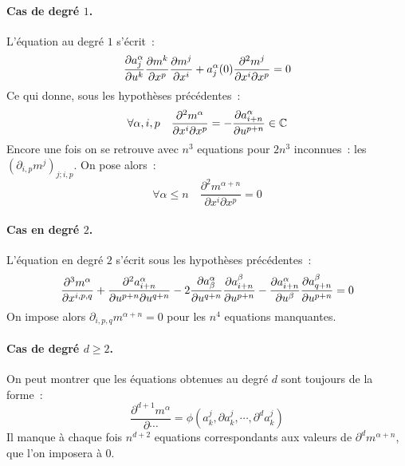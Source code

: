 \documentclass[a4paper,draft]{amsart}
\begin{document}
\paragraph{Cas de degré $1$.}
L'équation au degré $1$ s'écrit~:
\[
\dfrac{\partial{a_j^\alpha}}{\partial{u^k}}\dfrac{\partial{m^k}}{\partial{x^p}}\dfrac{\partial{m^j}}{\partial{x^i}} + a_j^\alpha(0)\dfrac{\partial^2 m^j}{\partial x^i \partial x^p} = 0
\]
Ce qui donne, sous les hypothèses précédentes~:
\[
\forall \alpha, i, p \quad \dfrac{\partial^2 m^\alpha}{\partial x^i \partial x^p} = -\dfrac{\partial{a_{i+n}^\alpha}}{\partial{u^{p+n}}} \in \mathbb{C}
\]
Encore une fois on se retrouve avec $n^3$ equations pour $2n^3$ inconnues~: les $(\partial_{i,p}m^j)_{j;i,p}$.
On pose alors~:
\[
\forall \alpha \leq n \quad \dfrac{\partial^2 m^{\alpha+n}}{\partial x^i \partial x^p} = 0
\]

\paragraph{Cas en degré $2$.} L'équation en degré $2$ s'écrit sous les hypothèses précédentes~:
\[
\dfrac{\partial^3 m^\alpha}{\partial x^{i,p,q}} + \dfrac{\partial^2 a^\alpha_{i+n}}{\partial u^{p+n} \partial u^{q+n}} - 2\dfrac{\partial{a^\alpha_\beta	}}{\partial{u^{q+n}}}\dfrac{\partial{a^\beta_{i+n}}}{\partial{u^{p+n}}} - \dfrac{\partial{a^\alpha_{i+n}}}{\partial{u^\beta}}\dfrac{\partial{a^\beta_{q+n}}}{\partial{u^{p+n}}} =0
\]
On impose alors $\partial_{i,p,q}m^{\alpha + n} = 0$ pour les $n^4$ equations manquantes.

\paragraph{Cas de degré $d \geq 2$.} On peut montrer que les équations obtenues au degré $d$ sont toujours de la forme~:
\[
\dfrac{\partial^{d+1}m^\alpha}{\partial \cdots} = \phi\left(a^j_k, \partial a^j_k, \cdots, \partial^{d}a^j_k\right)
\]
Il manque à chaque fois $n^{d+2}$ equations correspondants aux valeurs de $\partial^d m^{\alpha + n}$, que l'on imposera à $0$.
\end{document}
